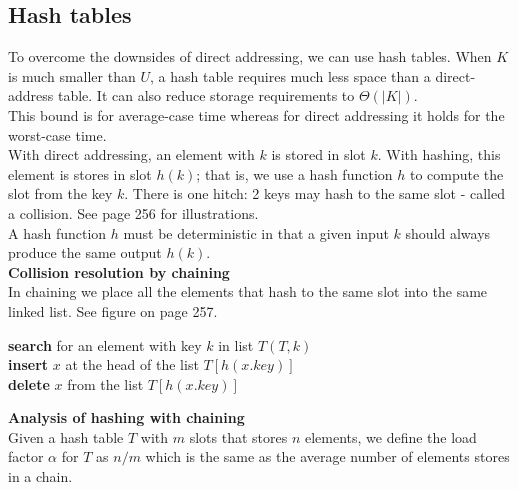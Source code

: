 \documentclass[12pt]{article}
\begin{document}
\subsection{Hash tables}
To overcome the downsides of direct addressing, we can use hash tables. When $K$ is much smaller than $U$, a hash table requires much less space than a direct-address table. It can also reduce storage requirements to $\Theta (|K|)$. \\

This bound is for average-case time whereas for direct addressing it holds for the worst-case time. \\

With direct addressing, an element with $k$ is stored in slot $k$. With hashing, this element is stores in slot $h(k)$; that is, we use a hash function $h$ to compute the slot from the key $k$. There is one hitch: 2 keys may hash to the same slot - called a collision. See page 256 for illustrations. \\

A hash function $h$ must be deterministic in that a given input $k$ should always produce the same output $h(k)$. \\

\textbf{Collision resolution by chaining}\\
In chaining we place all the elements that hash to the same slot into the same linked list. See figure on page 257.

\begin{algorithm}
\begin{algorithmic}[1]
   \State \textbf{search} for an element with key $k$ in list $T(T, k)$\\
   
   \State \textbf{insert} $x$ at the head of the list $T[h(x.key)]$\\

   \State \textbf{delete} $x$ from the list $T[h(x.key)]$
\end{algorithmic}
\end{algorithm}

\textbf{Analysis of hashing with chaining}\\
Given a hash table $T$ with $m$ slots that stores $n$ elements, we define the load factor $\alpha$ for $T$ as $n/m$ which is the same as the average number of elements stores in a chain. \\
\end{document}
